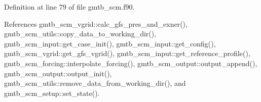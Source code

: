 Definition at line 79 of file gmtb\+\_\+scm.\+f90.



References gmtb\+\_\+scm\+\_\+vgrid\+::calc\+\_\+gfs\+\_\+pres\+\_\+and\+\_\+exner(), gmtb\+\_\+scm\+\_\+utils\+::copy\+\_\+data\+\_\+to\+\_\+working\+\_\+dir(), gmtb\+\_\+scm\+\_\+input\+::get\+\_\+case\+\_\+init(), gmtb\+\_\+scm\+\_\+input\+::get\+\_\+config(), gmtb\+\_\+scm\+\_\+vgrid\+::get\+\_\+gfs\+\_\+vgrid(), gmtb\+\_\+scm\+\_\+input\+::get\+\_\+reference\+\_\+profile(), gmtb\+\_\+scm\+\_\+forcing\+::interpolate\+\_\+forcing(), gmtb\+\_\+scm\+\_\+output\+::output\+\_\+append(), gmtb\+\_\+scm\+\_\+output\+::output\+\_\+init(), gmtb\+\_\+scm\+\_\+utils\+::remove\+\_\+data\+\_\+from\+\_\+working\+\_\+dir(), and gmtb\+\_\+scm\+\_\+setup\+::set\+\_\+state().

